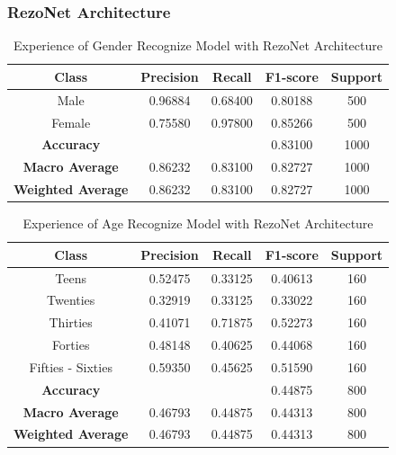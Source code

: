 \documentclass[conference, 10pt,onecolumn]{IEEEtran}
\begin{document}
\subsubsection{RezoNet Architecture}

\begin{table}[htbp]
    \centering
    \begin{tabular}{|c|cccc|}
        \hline
        \textbf{Class} & \textbf{Precision} & \textbf{Recall} & \textbf{F1-score} & \textbf{Support} \\
        \hline
        Male & 0.96884 & 0.68400 & 0.80188 & 500 \\
        Female & 0.75580 & 0.97800 & 0.85266 & 500 \\
        \hline
        \textbf{Accuracy} & \multicolumn{2}{c}{} & 0.83100 & 1000 \\
        \textbf{Macro Average} & 0.86232 & 0.83100 & 0.82727 & 1000 \\
        \textbf{Weighted Average} &0.86232 & 0.83100 & 0.82727  & 1000 \\
        \hline
    \end{tabular}
    \caption{Experience of Gender Recognize Model with RezoNet Architecture}
    \label{tab:Experience of Gender Recognize Model with RezoNet Architecture}
\end{table}

\begin{table}[htbp]
    \centering
    \begin{tabular}{|c|cccc|}
        \hline
        \textbf{Class} & \textbf{Precision} & \textbf{Recall} & \textbf{F1-score} & \textbf{Support} \\
        \hline
        Teens & 0.52475 & 0.33125 & 0.40613 & 160 \\
        Twenties & 0.32919 & 0.33125 & 0.33022 & 160 \\
        Thirties & 0.41071 & 0.71875 & 0.52273 & 160 \\
        Forties & 0.48148 & 0.40625 & 0.44068 & 160 \\
        Fifties - Sixties& 0.59350 & 0.45625 & 0.51590 & 160 \\
        \hline
        \textbf{Accuracy} &  &  & 0.44875 & 800 \\
        \textbf{Macro Average} & 0.46793 & 0.44875 & 0.44313 & 800 \\
        \textbf{Weighted Average} & 0.46793 & 0.44875 & 0.44313  & 800 \\
        \hline
    \end{tabular}
    \caption{Experience of Age Recognize Model with RezoNet Architecture}
    \label{tab:Experience of Age Recognize Model with RezoNet Architecture}
\end{table}
\end{document}
